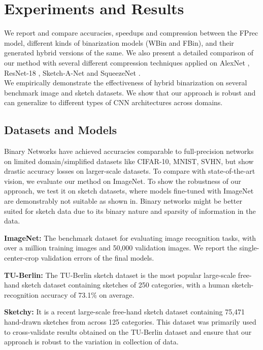 \documentclass[10pt,twocolumn,letterpaper]{article}
\begin{document}
\section{Experiments and Results}

We report and compare accuracies, speedups and compression between the FPrec model, different kinds of binarization models (WBin and FBin), and their generated hybrid versions of the same. We also present a detailed comparison of our method with several different compression techniques applied on AlexNet \cite{alex2012alexnet}, ResNet-18 \cite{he2016deep}, Sketch-A-Net \cite{eitz2012hdhso} and SqueezeNet \cite{iandola2016squeezenet}. \\
We empirically demonstrate the effectiveness of hybrid binarization on several benchmark image and sketch datasets. We show that our approach is robust and can generalize to different types of CNN architectures across domains.

\subsection{Datasets and Models}
Binary Networks have achieved accuracies comparable to full-precision networks on limited domain/simplified datasets like CIFAR-10, MNIST, SVHN, but show drastic accuracy losses on larger-scale datasets. To compare with state-of-the-art vision, we evaluate our method on ImageNet\cite{imagenet_cvpr09}. To show the robustness of our approach, we test it on sketch datasets, where models fine-tuned with ImageNet are demonstrably not suitable as shown in\cite{yu2015sketch}. Binary networks might be better suited for sketch data due to its binary nature and sparsity of information in the data. 

{\bf ImageNet:} The benchmark dataset for evaluating image recognition tasks, with over a million training images and 50,000 validation images. We report the single-center-crop validation errors of the final models.

{\bf TU-Berlin:} The TU-Berlin \cite{eitz2012hdhso} sketch dataset is the most popular large-scale free-hand sketch dataset containing sketches of 250 categories, with a human sketch-recognition accuracy of 73.1\% on average. 

{\bf Sketchy:} It is a recent large-scale free-hand sketch dataset containing 75,471 hand-drawn sketches from across 125 categories. This dataset was primarily used to cross-validate results obtained on the TU-Berlin dataset and ensure that our approach is robust to the variation in collection of data.
\end{document}
